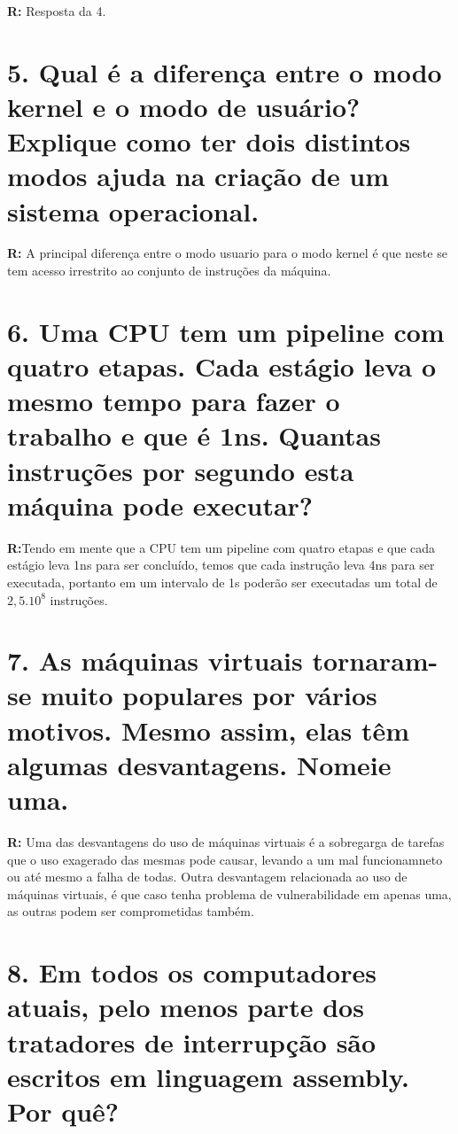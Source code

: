 \documentclass{article}
\begin{document}
\medskip
\noindent
\textbf{R:} Resposta da 4.

\section*{5. \large Qual é a diferença entre o modo kernel e o modo de usuário? Explique como ter dois distintos modos ajuda na criação de um sistema operacional.}

\medskip
\noindent
\textbf{R:} A principal diferença entre o modo usuario para o modo kernel é que neste se tem acesso irrestrito ao conjunto de instruções da máquina.

\section*{6. \large Uma CPU tem um pipeline com quatro etapas. Cada estágio leva o mesmo tempo para fazer o trabalho e que é 1ns. Quantas instruções por segundo esta máquina pode executar?}

\medskip
\noindent
\textbf{R:}Tendo em mente que a CPU tem um pipeline com quatro etapas e que cada estágio leva 1ns para ser concluído, temos que cada instrução leva 4ns para ser executada, portanto em um intervalo de 1s poderão ser executadas um total de $2,5.10^8$ instruções.

\section*{7. \large As máquinas virtuais tornaram-se muito populares por vários motivos. Mesmo assim, elas têm algumas desvantagens. Nomeie uma.}

\medskip
\noindent
\textbf{R:} Uma das desvantagens do uso de máquinas virtuais é a sobregarga de tarefas que o uso exagerado das mesmas pode causar, levando a um mal funcionamneto ou até mesmo a falha de todas. Outra desvantagem relacionada ao uso de máquinas virtuais, é que caso tenha problema de vulnerabilidade em apenas uma, as outras podem ser comprometidas também.

\section*{8. \large Em todos os computadores atuais, pelo menos parte dos tratadores de interrupção são escritos em linguagem assembly. Por quê?}
\end{document}
